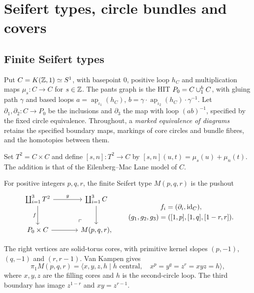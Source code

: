 \section{Seifert types, circle bundles and covers}\label{sec:seifert}

\subsection{Finite Seifert types}

Put $C=K(\mathbb Z,1)\simeq S^1$, with basepoint $0$, positive loop $h_C$ and multiplication maps $\mu_s:C\to C$ for $s\in\mathbb Z$. The pants graph is the HIT $P_0=C\mathbin{\cup}^{h}_1C$, with gluing path $\gamma$ and based loops $a=\operatorname{ap}_{\iota_1}(h_C)$, $b=\gamma\cdot\operatorname{ap}_{\iota_2}(h_C)\cdot\gamma^{-1}$. Let $\partial_1,\partial_2:C\to P_0$ be the inclusions and $\partial_3$ the map with loop $(ab)^{-1}$, specified by the fixed circle equivalence. Throughout, a \emph{marked equivalence of diagrams} retains the specified boundary maps, markings of core circles and bundle fibres, and the homotopies between them.


Set $T^2=C\times C$ and define $[s,n]:T^2\to C$ by $[s,n](u,t)=\mu_s(u)+\mu_n(t)$. The addition is that of the Eilenberg--Mac Lane model of $C$.
\begin{definition}\label{def:seifert}
For positive integers $p,q,r$, the finite Seifert type $M(p,q,r)$ is the pushout
\begin{equation}\label{diag:seifert}
\begin{tikzcd}[column sep=large,row sep=large]
\coprod_{i=1}^3 T^2 \arrow[r,"g"] \arrow[d,"f"'] \pomark & \coprod_{i=1}^3 C \arrow[d] \\
P_0\times C \arrow[r] & M(p,q,r),
\end{tikzcd}
\qquad
\begin{gathered}
f_i=(\partial_i,\id_C),\\
(g_1,g_2,g_3)=([1,p],[1,q],[1-r,r]).
\end{gathered}
\end{equation}
\end{definition}
The right vertices are solid-torus cores, with primitive kernel slopes $(p,-1)$, $(q,-1)$ and $(r,r-1)$. Van Kampen \cite[\S8.7]{hott} gives
\begin{equation}\label{eq:seifert-presentation}
\pi_1M(p,q,r)=\langle x,y,z,h\mid h\text{ central},\quad x^p=y^q=z^r=xyz=h\rangle,
\end{equation}
where $x,y,z$ are the filling cores and $h$ is the second-circle loop. The third boundary has image $z^{1-r}$ and $xy=z^{r-1}$.

